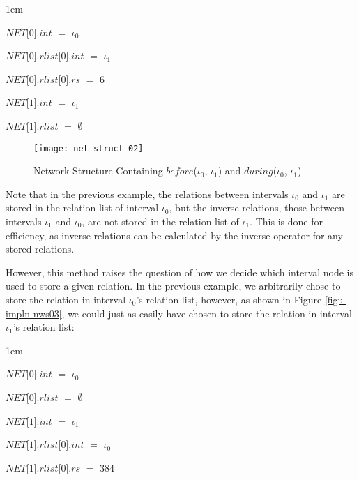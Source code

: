 \documentclass[11pt]{report}
\newenvironment{vquote}
{
  \begin{list}{}{\leftmargin 1em}\item[]
}
{
  \end{list}
}
\begin{document}
          \begin{vquote}
            $NET$[$0$].$int$ $=$ $\iota_0$

            $NET$[$0$].$rlist$[$0$].$int$ $=$ $\iota_1$

            $NET$[$0$].$rlist$[$0$].$rs$ $=$ $6$

            $NET$[$1$].$int$ $=$ $\iota_1$

            $NET$[$1$].$rlist$ $=$ $\emptyset$
          \end{vquote}

          \begin{figure}[tbhp]
            \begin{center}
              \texttt{[image: net-struct-02]}
              \caption{Network Structure Containing $before$($\iota_0$, $\iota_1$) and $during$($\iota_0$, $\iota_1$)}
              \label{figu-impln-nws02}
            \end{center}
          \end{figure}

          Note that in the previous example, the relations between intervals
          $\iota_0$ and $\iota_1$ are stored in the relation list of interval
          $\iota_0$, but the inverse relations, those between intervals
          $\iota_1$ and $\iota_0$, are not stored in the relation list of
          $\iota_1$. This is done for efficiency, as inverse relations can be
          calculated by the inverse operator for any stored relations.

          However, this method raises the question of how we decide which
          interval node is used to store a given relation. In the previous
          example, we arbitrarily chose to store the relation in interval
          $\iota_0$'s relation list, however, as shown in Figure
          \ref{figu-impln-nws03}, we could just as easily have chosen to store
          the relation in interval $\iota_1$'s relation list:

          \begin{vquote}
            $NET$[$0$].$int$ $=$ $\iota_0$

            $NET$[$0$].$rlist$ $=$ $\emptyset$

            $NET$[$1$].$int$ $=$ $\iota_1$

            $NET$[$1$].$rlist$[$0$].$int$ $=$ $\iota_0$

            $NET$[$1$].$rlist$[$0$].$rs$ $=$ $384$
          \end{vquote}
\end{document}
